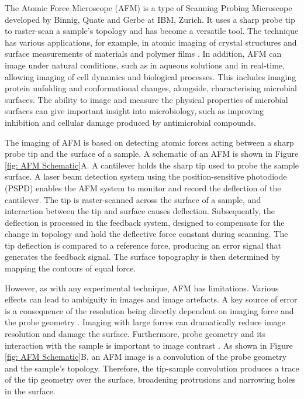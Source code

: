 
The Atomic Force Microscope (AFM) is a type of Scanning Probing Microscope\cite{salapaka2008scanning} developed by Binnig, Quate and Gerbe at IBM, Zurich\cite{PhysRevLett.56.930, eaton2010atomic}. It uses a sharp probe tip to raster-scan a sample's topology and has become a versatile tool\cite{JALILI2004907,SANTOS2004133, goken1999microstructural}. The technique has various applications, for example, in atomic imaging of crystal structures \cite{yu2016atomic} and surface measurements of materials and polymer films \cite{passeri2011indentation,d2012evaluation,dallaeva2014afm, acikgoz2020speed,zeng2017novel}. In addition, AFM can image under natural conditions, such as in aqueous solutions and in real-time, allowing imaging of cell dynamics and biological processes. This includes imaging protein unfolding \cite{hughes2016physics} and conformational changes\cite{moody2006atomic}, alongside, characterising microbial surfaces\cite{wright2006application,dufrene2004using}. The ability to image and measure the physical properties of microbial surfaces can give important insight into microbiology, such as improving inhibition and cellular damage produced by antimicrobial compounds\cite{wright2006application, TYAGI2010797}. 

The imaging of AFM is based on detecting atomic forces acting between a sharp probe tip and the surface of a sample. A schematic of an AFM is shown in Figure \ref{fig: AFM Schematic}A. A cantilever holds the sharp tip used to probe the sample surface. A laser beam detection system using the position-sensitive photodiode (PSPD) enables the AFM system to monitor and record the deflection of the cantilever. The tip is raster-scanned across the surface of a sample, and interaction between the tip and surface causes deflection. Subsequently, the deflection is processed in the feedback system, designed to compensate for the change in topology and hold the deflective force constant during scanning. The tip deflection is compared to a reference force, producing an error signal that generates the feedback signal. The surface topography is then determined by mapping the contours of equal force\cite{maghsoudy2018review}.

However, as with any experimental technique, AFM has limitations. Various effects can lead to ambiguity in images and image artefacts. A key source of error is a consequence of the resolution being directly dependent on imaging force and the probe geometry \cite{dufrene2002atomic}. Imaging with large forces can dramatically reduce image resolution and damage the surface. Furthermore, probe geometry and its interaction with the sample is important to image contrast \cite{dufrene2002atomic}. As shown in Figure \ref{fig: AFM Schematic}B, an AFM image is a convolution of the probe geometry and the sample's topology. Therefore, the tip-sample convolution produces a trace of the tip geometry over the surface, broadening protrusions and narrowing holes in the surface.

